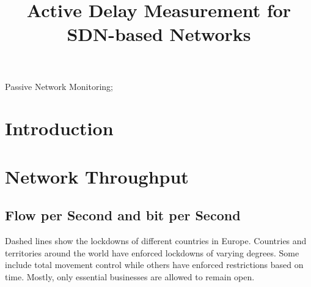 \documentclass[10pt, journal, letterpaper]{IEEEtran}
\begin{document}
\title{Active Delay Measurement for SDN-based Networks}
\author{}
\maketitle	
\begin{abstract}
\end{abstract}	
\begin{IEEEkeywords} 
    Passive Network Monitoring;
\end{IEEEkeywords}

\section{Introduction}

\section{Network Throughput}

\subsection{Flow per Second and bit per Second}
Dashed lines show the lockdowns of different countries in Europe. %
Countries and territories around the world have enforced lockdowns of varying degrees. Some include total movement control while others have enforced restrictions based on time. Mostly, only essential businesses are allowed to remain open.%

\begin{table}[]
    \centering
    \caption{Lock-downs}
    \label{tab:lockdowns}
\end{table}
\end{document}
